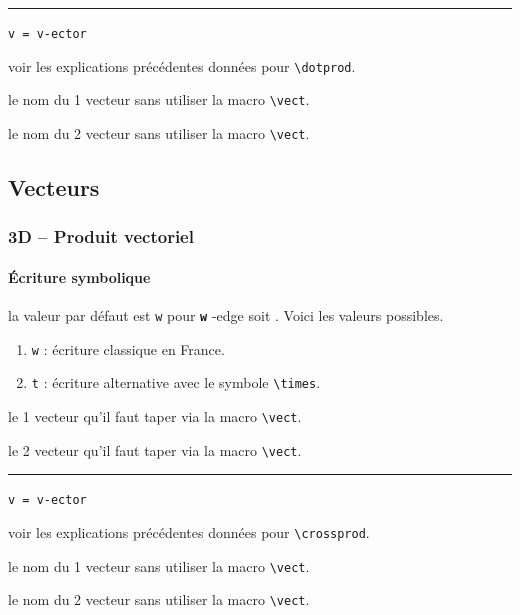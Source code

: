 \documentclass[12pt,a4paper]{book}
\makeatletter
\newcommand\env[1]{\texttt{#1}}
\newcommand\macro[1]{\env{\textbackslash{}#1}}
\theoremstyle{definition}
\newcommand\separation{
	\medskip
	\hfill\rule{0.5\textwidth}{0.75pt}\hfill
	\medskip
}
\newcommand\whyprefix[2]{%
	\textbf{\prefix{#1}}-#2%
}
\newcommand\mwhyprefix[2]{%
	\texttt{#1 = #1-#2}%
}
\newcommand\prefix[1]{%
	\texttt{#1}%
}
\newcommand\inenglish{\@ifstar{\@inenglish@star}{\@inenglish@no@star}}
\newcommand\@inenglish@star[1]{%
	\emph{\og #1 \fg}%
}
\newcommand\@inenglish@no@star[1]{%
	\@inenglish@star{#1} en anglais%
}
\makeatother
\begin{document}
{{\separation


 \hfill \mwhyprefix{v}{ector}

\IDoption{} voir les explications précédentes données pour \macro{dotprod}.

 le nom du 1\ier{} vecteur sans utiliser la macro \macro{vect}.

 le nom du 2\ieme{} vecteur sans utiliser la macro \macro{vect}.


\subsection{Vecteurs}

\subsubsection{3D -- Produit vectoriel}

\paragraph{Écriture symbolique}




\IDoption{} la valeur par défaut est \verb+w+ pour \whyprefix{w}{edge} soit \inenglish{coin}. Voici les valeurs possibles.

\begin{enumerate}
	\item \verb+w+ : écriture classique en France.

	\item \verb+t+ : écriture alternative avec le symbole \macro{times}.

\end{enumerate}

 le 1\ier{} vecteur qu'il faut taper via la macro \macro{vect}.

 le 2\ieme{} vecteur qu'il faut taper via la macro \macro{vect}.


\separation


 \hfill \mwhyprefix{v}{ector}

\IDoption{} voir les explications précédentes données pour \macro{crossprod}.

 le nom du 1\ier{} vecteur sans utiliser la macro \macro{vect}.

 le nom du 2\ieme{} vecteur sans utiliser la macro \macro{vect}.


}}
\end{document}
